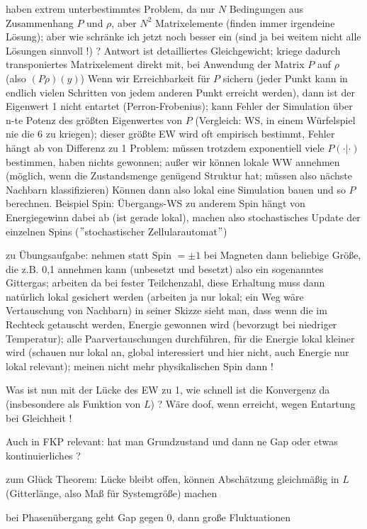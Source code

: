 \documentclass[../KlassMech_main.tex]{subfiles}
\begin{document}
haben extrem unterbestimmtes Problem, da nur $N$ Bedingungen aus Zusammenhang $P$ und $\rho$, aber $N^2$ Matrixelemente (finden immer irgendeine Lösung); aber wie schränke ich jetzt noch besser ein (sind ja bei weitem nicht alle Lösungen sinnvoll !) ? Antwort ist detailliertes Gleichgewicht; kriege dadurch transponiertes Matrixelement direkt mit, bei Anwendung der Matrix $P$ auf $\rho$ (also $(P\rho)(y)$)
Wenn wir Erreichbarkeit für $P$ sichern (jeder Punkt kann in endlich vielen Schritten von jedem anderen Punkt erreicht werden), dann ist der Eigenwert 1 nicht entartet (Perron-Frobenius); kann Fehler der Simulation über n-te Potenz des größten Eigenwertes von $P$ (Vergleich: WS, in einem Würfelspiel nie die 6 zu kriegen); dieser größte EW wird oft empirisch bestimmt, Fehler hängt ab von Differenz zu 1
Problem: müssen trotzdem exponentiell viele $P(\cdot|\cdot)$ bestimmen, haben nichts gewonnen; außer wir können lokale WW annehmen (möglich, wenn die Zustandsmenge genügend Struktur hat; müssen also nächste Nachbarn klassifizieren)
Können dann also lokal eine Simulation bauen und so $P$ berechnen. Beispiel Spin: Übergangs-WS zu anderem Spin hängt von Energiegewinn dabei ab (ist gerade lokal), machen also stochastisches Update der einzelnen Spins ($"$stochastischer Zellularautomat$"$)

zu Übungsaufgabe: nehmen statt Spin $=\pm 1$ bei Magneten dann beliebige Größe, die z.B. 0,1 annehmen kann (unbesetzt und besetzt) also ein sogenanntes Gittergas; arbeiten da bei fester Teilchenzahl, diese Erhaltung muss dann natürlich lokal gesichert werden (arbeiten ja nur lokal; ein Weg wäre Vertauschung von Nachbarn)
in seiner Skizze sieht man, dass wenn die im Rechteck getauscht werden, Energie gewonnen wird (bevorzugt bei niedriger Temperatur); alle Paarvertauschungen durchführen, für die Energie lokal kleiner wird (schauen nur lokal an, global interessiert und hier nicht, auch Energie nur lokal relevant); meinen nicht mehr physikalischen Spin dann !

Was ist nun mit der Lücke des EW zu 1, wie schnell ist die Konvergenz da (insbesondere als Funktion von $L$) ? Wäre doof, wenn erreicht, wegen Entartung bei Gleichheit !

Auch in FKP relevant: hat man Grundzustand und dann ne Gap oder etwas kontinuierliches ?

zum Glück Theorem: Lücke bleibt offen, können Abschätzung gleichmäßig in $L$ (Gitterlänge, also Maß für Systemgröße) machen

bei Phasenübergang geht Gap gegen 0, dann große Fluktuationen
\end{document}
